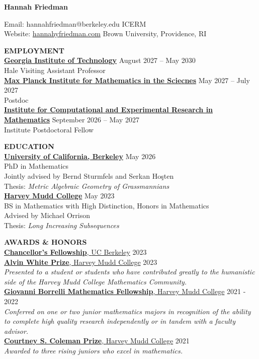\documentclass[11pt]{article}
\newcommand{\hdr}[1]{\textcolor{blue(ryb)}{\textbf{#1}}}
\newcommand{\role}[3]{\underline{\textbf{#1}, {#2}} \hfill #3}
\begin{document}
\begin{center}
\hdr{\Large{Hannah Friedman}}\\
\end{center}
Email: hannahfriedman@berkeley.edu \hfill ICERM\\
Website: \url{hannahyfriedman.com} \hfill Brown University, Providence, RI

\bigskip
\raggedright
\hdr{EMPLOYMENT}\\
\textbf{\underline{Georgia Institute of Technology}} \hfill August 2027 -- May 2030\\
Hale Visiting Assistant Professor\\
\textbf{\underline{Max Planck Institute for Mathematics in the Sciecnes}} \hfill May 2027 -- July 2027\\
Postdoc\\
\textbf{\underline{Institute for Computational and Experimental Research in Mathematics}} \hfill September 2026 -- May 2027\\
Institute Postdoctoral Fellow

\bigskip

\hdr{EDUCATION}\\
\textbf{\underline{University of California, Berkeley}} \hfill May 2026\\
PhD in Mathematics\\
Jointly advised by Bernd Sturmfels and Serkan Ho\c{s}ten\\
Thesis: \emph{Metric Algebraic Geometry of Grassmannians}\\
\textbf{\underline{Harvey Mudd College}} \hfill May 2023\\
BS in Mathematics with High Distinction, Honors in Mathematics\\
Advised by Michael Orrison\\
Thesis: \emph{Long Increasing Subsequences}

\bigskip

\hdr{AWARDS \& HONORS}\\
\role{Chancellor's Fellowship}{UC Berkeley}{2023}\\
\role{Alvin White Prize}{Harvey Mudd College}{2023}\\
\textit{Presented to a student or students who have contributed greatly to the humanistic side of the Harvey Mudd College Mathematics Community.}\\
\role{Giovanni Borrelli Mathematics Fellowship}{Harvey Mudd College}{2021 - 2022}\\
\textit{Conferred on one or two junior mathematics majors in recognition of the ability to complete high quality research independently or in tandem with a faculty advisor.}\\
\role{Courtney S. Coleman Prize}{Harvey Mudd College}{2021}\\
\textit{Awarded to three rising juniors who excel in mathematics.}
\end{document}
